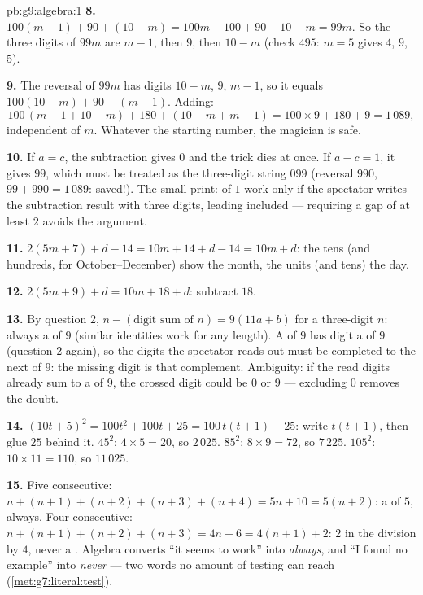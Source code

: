 \begin{solution}{pb:g9:algebra:1}
\textbf{8.} $100(m - 1) + 90 + (10 - m) = 100m - 100 + 90 + 10
- m = 99m$. So the three digits of $99m$ are $m - 1$, then $9$,
then $10 - m$ (check $495$: $m = 5$ gives $4$, $9$, $5$).

\textbf{9.} The reversal of $99m$ has digits $10 - m$, $9$,
$m - 1$, so it equals $100(10 - m) + 90 + (m - 1)$. Adding:
\[
100\,(m - 1 + 10 - m) + 180 + (10 - m + m - 1)
= 100 \times 9 + 180 + 9 = 1\,089 ,
\]
independent of $m$. Whatever the starting number, the magician
is safe.

\textbf{10.} If $a = c$, the subtraction gives $0$ and the trick
dies at once. If $a - c = 1$, it gives $99$, which must be
treated as the three-digit string $099$ (reversal $990$,
$99 + 990 = 1\,089$: saved!). The small print:  of
$1$ work only if the spectator writes the subtraction result
with three digits, leading  included --- requiring a gap of
at least $2$ avoids the argument.

\textbf{11.} $2(5m + 7) + d - 14 = 10m + 14 + d - 14 =
10m + d$: the tens (and hundreds, for October--December) show
the month, the units (and tens) the day.

\textbf{12.} $2(5m + 9) + d = 10m + 18 + d$: subtract $18$.

\textbf{13.} By question 2, $n - (\text{digit sum of } n) =
9(11a + b)$ for a three-digit $n$: always a  of $9$
(similar identities work for any length). A  of $9$ has
digit  a  of $9$ (question 2 again), so the digits
the spectator reads out must be completed to the next 
of $9$: the missing digit is that complement. Ambiguity: if the
read digits already sum to a  of $9$, the crossed digit
could be $0$ or $9$ --- excluding $0$ removes the doubt.

\textbf{14.} $(10t + 5)^2 = 100t^2 + 100t + 25 =
100\,t(t + 1) + 25$: write $t(t+1)$, then glue $25$ behind it.
$45^2$: $4 \times 5 = 20$, so $2\,025$. $85^2$:
$8 \times 9 = 72$, so $7\,225$. $105^2$: $10 \times 11 = 110$,
so $11\,025$.

\textbf{15.} Five consecutive: $n + (n+1) + (n+2) + (n+3) +
(n+4) = 5n + 10 = 5(n + 2)$: a  of $5$, always. Four
consecutive: $n + (n+1) + (n+2) + (n+3) = 4n + 6 =
4(n + 1) + 2$:  $2$ in the division by $4$, never a
. Algebra converts ``it seems to work'' into
\emph{always}, and ``I found no example'' into \emph{never} ---
two words no amount of testing can reach
(\cref{met:g7:literal:test}).
\end{solution}
